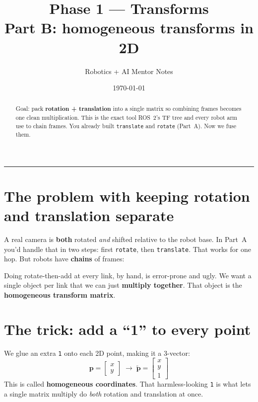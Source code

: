 \documentclass[11pt]{article}
\title{\textbf{Phase 1 --- Transforms}\\[4pt]
\large Part B: homogeneous transforms in 2D}
\author{Robotics + AI Mentor Notes}
\date{\today}
\begin{document}
\maketitle

\begin{abstract}
\noindent Goal: pack \textbf{rotation + translation} into a single matrix so
combining frames becomes one clean multiplication. This is the exact tool ROS~2's
TF tree and every robot arm use to chain frames. You already built
\texttt{translate} and \texttt{rotate} (Part~A). Now we fuse them.
\end{abstract}

\tableofcontents
\bigskip
\hrule

\section{The problem with keeping rotation and translation separate}

A real camera is \textbf{both} rotated \emph{and} shifted relative to the robot
base. In Part~A you'd handle that in two steps: first \texttt{rotate}, then
\texttt{translate}. That works for one hop. But robots have \textbf{chains} of
frames:

\begin{center}
\end{center}

Doing rotate-then-add at every link, by hand, is error-prone and ugly. We want a
single object per link that we can just \textbf{multiply together}. That object is
the \textbf{homogeneous transform matrix}.

\section{The trick: add a ``1'' to every point}

We glue an extra \texttt{1} onto each 2D point, making it a 3-vector:
\[
  \mathbf{p} = \begin{bmatrix} x \\ y \end{bmatrix}
  \;\longrightarrow\;
  \tilde{\mathbf{p}} = \begin{bmatrix} x \\ y \\ 1 \end{bmatrix}
\]
This is called \textbf{homogeneous coordinates}. That harmless-looking \texttt{1}
is what lets a single matrix multiply do \emph{both} rotation and translation at
once.
\end{document}
